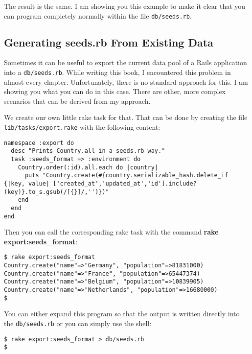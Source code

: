 \documentclass[a4paper]{book}
\begin{document}
The result is the same. I am showing you this example to make it clear that you can program completely normally within the file \texttt{db/seeds.rb}.

\subsection{Generating seeds.rb From Existing Data}\label{generating-seeds.rb-from-existing-data}

Sometimes it can be useful to export the current data pool of a Rails application into a \texttt{db/seeds.rb}. While writing this book, I encountered this problem in almost every chapter. Unfortunately, there is no standard approach for this. I am showing you what you can do in this case. There are other, more complex scenarios that can be derived from my approach.

We create our own little rake task for that. That can be done by creating the file \texttt{lib/tasks/export.rake} with the following content:

\begin{shaded}\begin{verbatim}
namespace :export do
  desc "Prints Country.all in a seeds.rb way."
  task :seeds_format => :environment do
    Country.order(:id).all.each do |country|
      puts "Country.create(#{country.serializable_hash.delete_if {|key, value| ['created_at','updated_at','id'].include?(key)}.to_s.gsub(/[{}]/,'')})"
    end
  end
end
\end{verbatim}\end{shaded}

Then you can call the corresponding rake task with the command \textbf{rake export:seeds\_format}:

\begin{shaded}\begin{verbatim}
$ rake export:seeds_format
Country.create("name"=>"Germany", "population"=>81831000)
Country.create("name"=>"France", "population"=>65447374)
Country.create("name"=>"Belgium", "population"=>10839905)
Country.create("name"=>"Netherlands", "population"=>16680000)
$
\end{verbatim}\end{shaded}

You can either expand this program so that the output is written directly into the \texttt{db/seeds.rb} or you can simply use the shell:

\begin{shaded}\begin{verbatim}
$ rake export:seeds_format > db/seeds.rb
$
\end{verbatim}\end{shaded}
\end{document}
